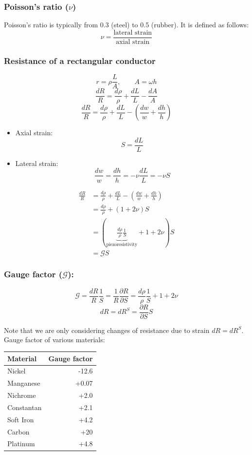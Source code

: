 \documentclass[11pt]{article}
\begin{document}
\subsubsection{Poisson's ratio (\(\nu\))}
\label{sec:org9979e33}
Poisson's ratio is typically from 0.3 (steel) to 0.5 (rubber). It is defined as follows:
\[\nu = \frac{\text{lateral strain}}{\text{axial strain}}\]

 \newpage
\subsubsection{Resistance of a rectangular conductor}
\label{sec:orgf510c44}
\[r = \rho \frac{L}{A}, \qquad A = \omega h\]
\[\frac{dR}{R} = \frac{d \rho}{\rho} + \frac{dL}{L} - \frac{dA}{A}\]
\[\frac{dR}{R} = \frac{d \rho}{\rho} + \frac{dL}{L} - \left(\frac{dw}{w} + \frac{dh}{h} \right)\]

\begin{itemize}
\item Axial strain:
\[S = \frac{dL}{L}\]
\item Lateral strain:
\[\frac{dw}{w} = \frac{dh}{h} = - \nu \frac{dL}{L} = - \nu S\]
\end{itemize}

\begin{align*}
\frac{dR}{R} &= \frac{d \rho}{\rho} + \frac{dL}{L} - \left(\frac{dw}{w} + \frac{dh}{h} \right) \\
&= \frac{d \rho}{\rho} + (1 + 2 \nu) S \\
&= \left(\underbrace{\frac{d \rho}{\rho} \frac{1}{S}}_{\text{piezoresistivity}} + 1 + 2 \nu \right) S \\
&= \mathcal{G} S
\end{align*}

 \newpage
\subsubsection{Gauge factor (\(\mathcal{G}\)):}
\label{sec:org3c54827}
\[\mathcal{G} = \frac{dR}{R} \frac{1}{S} = \frac{1}{R} \frac{\partial R}{\partial S} = \frac{d \rho}{\rho} \frac{1}{S} + 1 + 2 \nu\]
\[dR = dR^S = \frac{\partial R}{\partial S} S\]

Note that we are only considering changes of resistance due to strain \(dR = dR^S\).  \\

Gauge factor of various materials:
\begin{center}
\begin{tabular}{l|r}
Material & Gauge factor\\
\hline
Nickel & -12.6\\
Manganese & +0.07\\
Nichrome & +2.0\\
Constantan & +2.1\\
Soft Iron & +4.2\\
Carbon & +20\\
Platinum & +4.8\\
\end{tabular}
\end{center}
\end{document}
